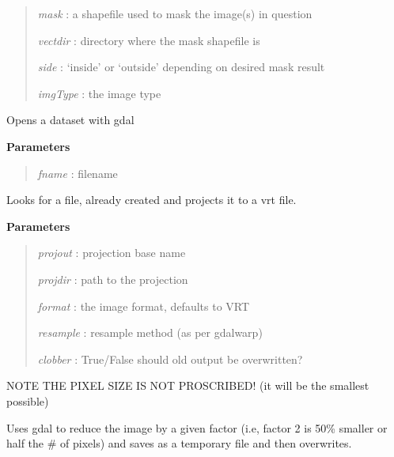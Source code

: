 \documentclass[letterpaper,10pt,openany,oneside]{sphinxmanual}
\begin{document}
\begin{fulllineitems}
\begin{fulllineitems}
\begin{quote}
\emph{mask}    : a shapefile used to mask the image(s) in question

\emph{vectdir} : directory where the mask shapefile is

\emph{side}    : `inside' or `outside' depending on desired mask result

\emph{imgType} : the image type
\end{quote}

\end{fulllineitems}


\begin{fulllineitems}
\label{code:Image.Image.openDataset}
Opens a dataset with gdal

\textbf{Parameters}
\begin{quote}

\emph{fname} : filename
\end{quote}

\end{fulllineitems}


\begin{fulllineitems}
\label{code:Image.Image.projectImg}
Looks for a file, already created and projects it to a vrt file.

\textbf{Parameters}
\begin{quote}

\emph{projout}  : projection base name

\emph{projdir}  : path to the projection

\emph{format}   : the image format, defaults to VRT

\emph{resample} : resample method (as per gdalwarp)

\emph{clobber}  : True/False should old output be overwritten?
\end{quote}

NOTE THE PIXEL SIZE IS NOT PROSCRIBED! (it will be the smallest possible)

\end{fulllineitems}


\begin{fulllineitems}
\label{code:Image.Image.reduceImg}
Uses gdal to reduce the image by a given factor (i.e, factor 2 is 50\%
smaller or half the \# of pixels) and saves as a temporary file and then overwrites.


\end{fulllineitems}
\end{fulllineitems}
\end{document}
